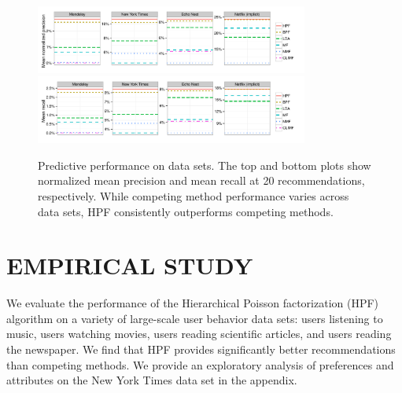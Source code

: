 \begin{figure}[t!]
\centering
\includegraphics[width=0.8\textwidth]{newfigs/mean_precision_at_20.pdf}\\
\includegraphics[width=0.8\textwidth]{newfigs/mean_recall_at_20.pdf}\\
\caption{Predictive performance on data sets. The top and bottom plots
  show normalized mean precision and mean recall at 20
  recommendations, respectively. While competing method performance
  varies across data sets, HPF consistently outperforms competing
  methods.}
\label{fig:precision_recall}
\end{figure}


\section{EMPIRICAL STUDY}
\label{sec:eval}
We evaluate the performance of the Hierarchical Poisson factorization
(HPF) algorithm on a variety of large-scale user behavior data sets:
users listening to music, users watching movies, users reading
scientific articles, and users reading the newspaper.  We find that
HPF provides significantly better recommendations than competing
methods. We provide an exploratory analysis of preferences and
attributes on the New York Times data set in the appendix.

